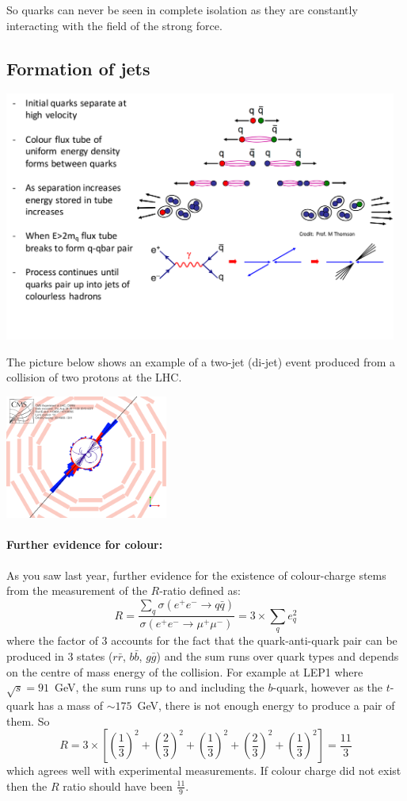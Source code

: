 So quarks can never be seen in complete isolation as they are constantly interacting with the field of the strong force.

\subsection{Formation of jets}
\label{sec:FormationOfJets}
\begin{center}
\includegraphics[width=0.97\textwidth]{fig/strongforce/jet_formation_2.pdf}
\end{center}

The picture below shows an example of a two-jet (di-jet) event produced from a collision of two protons at the LHC. 
\begin{center}
\includegraphics[width=0.4\textwidth]{fig/strongforce/cms_dijet.png}
\end{center}


\paragraph{Further evidence for colour:}
As you saw last year, further evidence for the existence of colour-charge stems from the measurement of the $R$-ratio defined as:
\[
R=\frac{\sum_q\sigma(e^+e^-\to q\bar{q})}{\sigma(e^+e^-\to\mu^+\mu^-)}=3\times\sum_q e_{q}^{2}
\]
where the factor of 3 accounts for the fact that the quark-anti-quark pair can be produced in 3 states ($r\bar{r}$, $b\bar{b}$, $g\bar{g}$) and the sum runs over quark types and depends on the centre of mass energy of the collision. For example at LEP1 where $\sqrt{s}=91$~GeV, the sum runs up to and including the $b$-quark, however as the $t$-quark has a mass of $\sim 175$~GeV, there is not enough energy to produce a pair of them. So 
\[
R=3\times\left[\left(\frac{1}{3}\right)^2+\left(\frac{2}{3}\right)^2+\left(\frac{1}{3}\right)^2+\left(\frac{2}{3}\right)^2+\left(\frac{1}{3}\right)^2\right]=\frac{11}{3}
\]
which agrees well with experimental measurements. If colour charge did not exist then the $R$ ratio should have been $\frac{11}{9}$.

